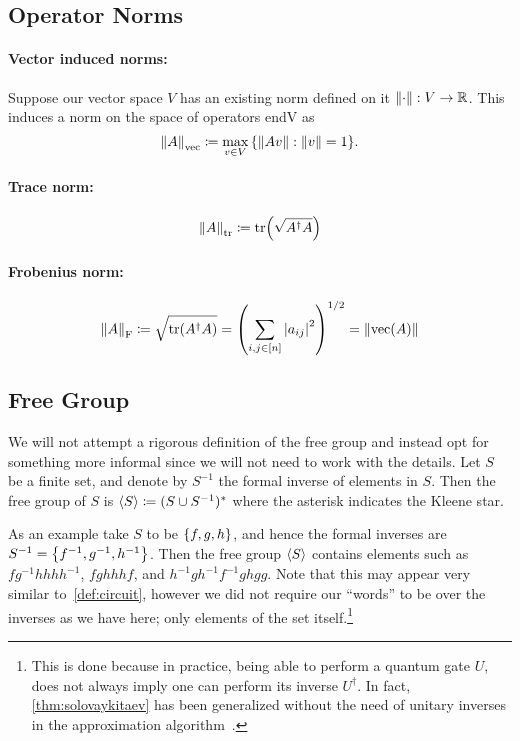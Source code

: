 \subsection{Operator Norms}

\paragraph{Vector induced norms:}
Suppose our vector space $V$ has an existing norm defined on it $\norm{\cdot}: V \to \mathbb{R}$.
This induces a norm on the space of operators \gls{endV} as
\begin{equation}
    \norm{A}_\text{vec} \coloneqq \max_{v \in V}\qty{\norm{A v}: \norm{v} = 1}.
\end{equation}

\paragraph{Trace norm:}
\begin{equation}
    \norm{A}_\text{tr} \coloneqq \tr(\sqrt{A^\dagger A})
\end{equation}

\paragraph{Frobenius norm:}
\begin{equation}
    \norm{A}_\text{F} \coloneqq \sqrt{\tr(A^\dagger A)} = \qty(\sum_{i, j \in [n]}\abs{a_{ij}}^2)^{1/2} = \norm{\operatorname{vec}(A)}
\end{equation}


\subsection{Free Group}
We will not attempt a rigorous definition of the free group and instead opt for something more informal since we will not need to work with the details.
Let $S$ be a finite set, and denote by $S^{-1}$ the formal inverse of elements in $S$.
Then the free group of $S$ is $\expval{S} \coloneqq (S\cup S^{-1})^*$ where the asterisk indicates the Kleene star.

As an example take $S$ to be $\qty{f, g, h}$, and hence the formal inverses are $S^{-1} = \qty{f^{-1}, g^{-1}, h^{-1}}$.
Then the free group $\expval{S}$ contains elements such as $fg^{-1}hhhh^{-1}$, $fghhhf$, and $h^{-1}gh^{-1}f^{-1}ghgg$.
Note that this may appear very similar to~\cref{def:circuit}, however we did not require our ``words'' to be over the inverses as we have here; only elements of the set itself.\footnote{This is done because in practice, being able to perform a quantum gate $U$, does not always imply one can perform its inverse $U^\dagger$. In fact, \cref{thm:solovaykitaev} has been generalized without the need of unitary inverses in the approximation algorithm~\cite{inverse-free-sk}.}

